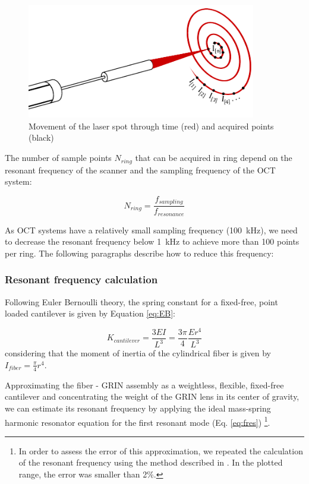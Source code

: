 \begin{figure}[h!]\centering
      \includegraphics[width=10cm]{figures/30_DesignSimulation/Mechanical/spiralScanning.pdf}
      \caption{Movement of the laser spot through time (red) and acquired points (black)}
      \label{fig:spiralScanning}
\end{figure}

The number of sample points $N_{ring}$ that can be acquired in ring depend on the resonant frequency of the scanner and the sampling frequency of the OCT system:

\begin{equation}
N_{ring} = \frac{f_{sampling}}{f_{resonance}}
\label{eq:nring}
\end{equation}

As OCT systems have a relatively small sampling frequency (\SI{100}{\kilo\hertz}), we need to decrease the resonant frequency below \SI{1}{kHz} to achieve more than 100 points per ring. The following paragraphs describe how to reduce this frequency:

\subsubsection{Resonant frequency calculation}
Following Euler Bernoulli theory, the spring constant for a fixed-free, point loaded cantilever is given by Equation \ref{eq:EB}: 

\begin{equation}
K_{cantilever} = \frac{3 E I}{L^3} = \frac{3 \pi}{4} \frac{E r^4}{L^3}
\label{eq:EB}
\end{equation}
\noindent
considering that the moment of inertia of the cylindrical fiber is given by $I_{fiber} = \frac{\pi}{4} r^4$.

Approximating the fiber - GRIN assembly as a weightless, flexible, fixed-free cantilever and concentrating the weight of the GRIN lens in its center of gravity, we can estimate its resonant frequency by applying the ideal mass-spring harmonic resonator equation for the first resonant mode (Eq. \ref{eq:fres}) \footnote{In order to assess the error of this approximation, we repeated the calculation of the resonant frequency using the method described in \cite{Huo2010}. In the plotted range, the error was smaller than 2\%.}. 

